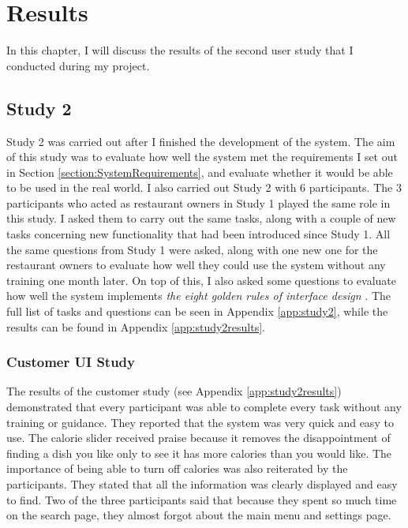 \chapter{Results}

In this chapter, I will discuss the results of the second user study that I conducted during my project.

\section{Study 2}
\label{section:Study2Results}

Study 2 was carried out after I finished the development of the system. The aim of this study was to evaluate how well the system met the requirements I set out in Section \ref{section:SystemRequirements}, and evaluate whether it would be able to be used in the real world. I also carried out Study 2 with 6 participants. The 3 participants who acted as restaurant owners in Study 1 played the same role in this study. I asked them to carry out the same tasks, along with a couple of new tasks concerning new functionality that had been introduced since Study 1. All the same questions from Study 1 were asked, along with one new one for the restaurant owners to evaluate how well they could use the system without any training one month later. On top of this, I also asked some questions to evaluate how well the system implements \textit{the eight golden rules of interface design} \cite{shneiderman}. The full list of tasks and questions can be seen in Appendix \ref{app:study2}, while the results can be found in Appendix \ref{app:study2results}.

\subsection{Customer UI Study}

The results of the customer study (see Appendix \ref{app:study2results}) demonstrated that every participant was able to complete every task without any training or guidance. They reported that the system was very quick and easy to use. The calorie slider received praise because it removes the disappointment of finding a dish you like only to see it has more calories than you would like. The importance of being able to turn off calories was also reiterated by the participants. They stated that all the information was clearly displayed and easy to find. Two of the three participants said that because they spent so much time on the search page, they almost forgot about the main menu and settings page.


